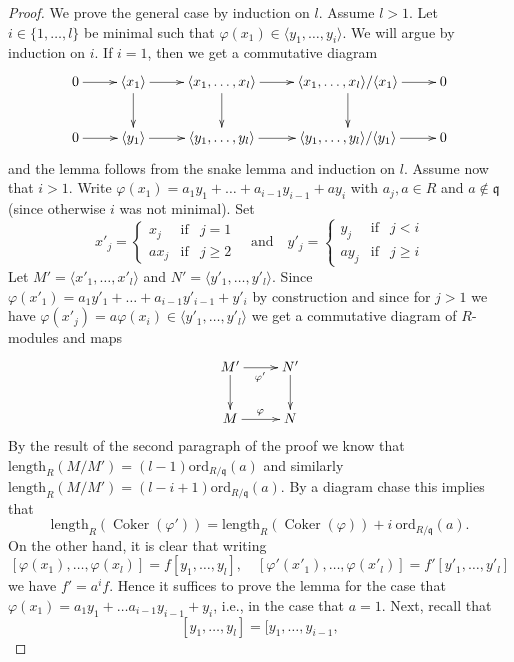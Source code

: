 \documentclass[10pt,a4paper]{amsart}
\theoremstyle{plain}
\theoremstyle{definition}
\theoremstyle{remark}
\numberwithin{equation}{subsection}
\def\Coker{\mathop{\mathrm{Coker}}}
\begin{document}
\begin{proof}
\medskip\noindent
We prove the general case by induction on $l$. Assume $l > 1$.
Let $i \in \{1, \ldots, l\}$ be minimal such that
$\varphi(x_1) \in \langle y_1, \ldots, y_i\rangle$.
We will argue by induction on $i$.
If $i = 1$, then we get a commutative diagram
$$
\xymatrix{
0 \ar[r] &
\langle x_1 \rangle \ar[r] \ar[d] &
\langle x_1, \ldots, x_l \rangle \ar[r] \ar[d] &
\langle x_1, \ldots, x_l \rangle / \langle x_1 \rangle \ar[r] \ar[d] &
0 \\
0 \ar[r] &
\langle y_1 \rangle \ar[r] &
\langle y_1, \ldots, y_l \rangle \ar[r] &
\langle y_1, \ldots, y_l \rangle / \langle y_1 \rangle \ar[r] &
0
}
$$
and the lemma follows from the snake lemma and induction on $l$.
Assume now that $i > 1$.
Write $\varphi(x_1) = a_1 y_1 + \ldots + a_{i - 1} y_{i - 1} + a y_i$
with $a_j, a \in R$ and $a \not \in \mathfrak q$ (since otherwise
$i$ was not minimal). Set
$$
x'_j =
\left\{
\begin{matrix}
x_j & \text{if} & j = 1 \\
ax_j & \text{if} & j \geq 2
\end{matrix}
\right.
\quad\text{and}\quad
y'_j =
\left\{
\begin{matrix}
y_j & \text{if} & j < i \\
ay_j & \text{if} & j \geq i
\end{matrix}
\right.
$$
Let $M' = \langle x'_1, \ldots, x'_l \rangle$ and
$N' = \langle y'_1, \ldots, y'_l \rangle$.
Since $\varphi(x'_1) = a_1 y'_1 + \ldots + a_{i - 1} y'_{i - 1} + y'_i$
by construction and since for $j > 1$ we have
$\varphi(x'_j) = a\varphi(x_i) \in \langle y'_1, \ldots, y'_l\rangle$
we get a commutative diagram of $R$-modules and maps
$$
\xymatrix{
M' \ar[d] \ar[r]_{\varphi'} & N' \ar[d] \\
M \ar[r]^\varphi & N
}
$$
By the result of the second paragraph of the proof we know
that $\text{length}_R(M/M') = (l - 1)\text{ord}_{R/\mathfrak q}(a)$
and similarly
$\text{length}_R(M/M') = (l - i + 1)\text{ord}_{R/\mathfrak q}(a)$.
By a diagram chase this implies that
$$
\text{length}_R(\Coker(\varphi')) =
\text{length}_R(\Coker(\varphi)) + i\ \text{ord}_{R/\mathfrak q}(a).
$$
On the other hand, it is clear that writing
$$
[\varphi(x_1), \ldots, \varphi(x_l)] = f [y_1, \ldots, y_l],
\quad
[\varphi'(x'_1), \ldots, \varphi(x'_l)] = f' [y'_1, \ldots, y'_l]
$$
we have $f' = a^if$. Hence it suffices to prove the lemma for the
case that $\varphi(x_1) = a_1y_1 + \ldots a_{i - 1}y_{i - 1} + y_i$,
i.e., in the case that $a = 1$. Next, recall that
$$
[y_1, \ldots, y_l] = [y_1, \ldots, y_{i - 1},
$$
\end{proof}
\end{document}

